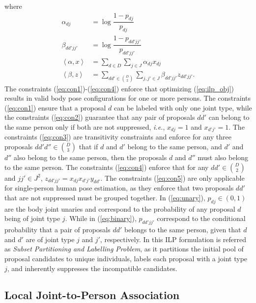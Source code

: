\documentclass[runningheads]{llncs}
\newcommand{\ie}{\mbox{\emph{i.e.}}}
\begin{document}
where
\begin{align}
\alpha_{dj} &= \log \dfrac{1-p_{dj}}{p_{dj}} \label{eq:unary} \\
\beta_{dd'jj'} &= \log \dfrac{1-p_{dd'jj'}}{p_{dd'jj'}} \label{eq:binary} \\
\left\langle \alpha, x \right\rangle &= \sum_{d \in D} \sum_{j \in J} \alpha_{dj} x_{dj} \\
\left\langle \beta, z \right\rangle &= \sum_{dd' \in \binom D2} \sum_{j,j' \in J} \beta_{dd'jj'} z_{dd'jj'}.
\end{align}
The constraints (\ref{eq:con1})-(\ref{eq:con4}) enforce that optimizing (\ref{eq:ilp_obj}) results in valid body pose configurations for one or more persons. The constraints (\ref{eq:con1}) ensure that a proposal $d$ can be labeled with only one joint type, while the constraints (\ref{eq:con2}) guarantee that any pair of proposals $dd'$ can belong to the same person only if both are not suppressed, \ie, $x_{dj} = 1$ and $x_{d'j'} = 1$. The constraints (\ref{eq:con3}) are transitivity constraints and enforce for any three proposals $dd'd'' \in \binom D3$ that if $d$ and $d'$ belong to the same person, and $d'$ and $d''$ also belong to the same person, then the proposals $d$ and $d''$ must also belong to the same person. The constraints (\ref{eq:con4}) enforce that for any $dd' \in \binom D2$ and $jj' \in J^2$, $z_{dd'jj'} = x_{dj}x_{d'j'}y_{dd'}$. The constraints (\ref{eq:con5}) are only applicable for single-person human pose estimation, as they enforce that two proposals $dd'$ that are not suppressed must be grouped together.  In (\ref{eq:unary}), $p_{dj} \in (0,1)$ are the body joint unaries and correspond to the probability of any proposal $d$ being of joint type $j$.  While in (\ref{eq:binary}), $p_{dd'jj'}$ correspond to the conditional probability that a pair of proposals $dd'$ belongs to the same person, given that $d$ and $d'$ are of joint type $j$ and $j'$, respectively. In \cite{pishchulin2015deepcut} this ILP formulation is referred as \textit{Subset Partitioning and Labelling Problem}, as it partitions the initial pool of proposal candidates to unique individuals, labels each proposal with a joint type $j$, and inherently suppresses the incompatible candidates. 

\subsection{Local Joint-to-Person Association}
\label{sec:local_joint_to_person_association}
\end{document}
